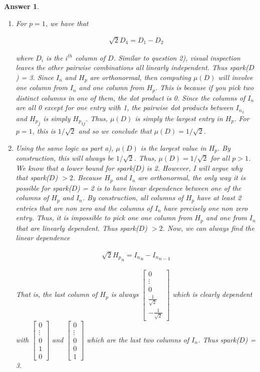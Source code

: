 \documentclass[12pt]{article}
\theoremstyle{colon}
\newtheorem*{answer}{Answer}
\begin{document}
\begin{answer}
  \

  \begin{enumerate}[label=\alph*)]
    \item For $p = 1$, we have that

      \begin{gather*}
        \sqrt{2} D_4 = D_1 - D_2
      \end{gather*}

      where $D_i$ is the $i^{th}$ column of $D$. Similar to question 2), visual inspection leaves the other pairwise combinations all linearly independent. Thus spark($D$) = 3. Since $I_n$ and $H_p$ are orthonormal, then computing $\mu(D)$ will involve one column from $I_n$ and one column from $H_p$. This is because if you pick two distinct columns in one of them, the dot product is 0. Since the columns of $I_n$ are all 0 except for one entry with 1, the pairwise dot products between ${I_n}_i$ and ${H_p}_j$ is simply ${H_p}_{ij}$. Thus, $\mu(D)$ is simply the largest entry in $H_p$. For $p=1$, this is $1/\sqrt{2}$ and so we conclude that $\mu(D) = 1/\sqrt{2}$.

    \item Using the same logic as part a), $\mu(D)$ is the largest value in $H_p$. By construction, this will always be $1/\sqrt{2}$. Thus, $\mu(D) = 1/\sqrt{2}$ for all $p > 1$. We know that a lower bound for spark($D$) is 2. However, I will argue why that spark($D$) $> 2$. Because $H_p$ and $I_n$ are orthonormal, the only way it is possible for spark($D$) = 2 is to have linear dependence between one of the columns of $H_p$ and $I_n$. By construction, all columns of $H_p$ have at least 2 entries that are non zero and the columns of $I_n$ have precisely one non zero entry. Thus, it is impossible to pick one one column from $H_p$ and one from $I_n$ that are linearly dependent. Thus spark($D$) $ > 2$. Now, we can always find the linear dependence

      \begin{gather*}
        \sqrt{2} {H_p}_{n} = {I_n}_n - {I_n}_{n-1}
      \end{gather*}

      That is, the last column of $H_p$ is always $\begin{bmatrix}0 \\ \vdots \\ 0 \\ \frac{1}{\sqrt{2}} \\ -\frac{1}{\sqrt{2}}\end{bmatrix}$ which is clearly dependent with $\begin{bmatrix}0 \\ \vdots \\ 0 \\ 1 \\ 0\end{bmatrix}$ and $\begin{bmatrix}0 \\ \vdots \\ 0 \\ 0 \\ 1\end{bmatrix}$ which are the last two columns of $I_n$. Thus spark($D$) = 3.


\end{enumerate}
\end{answer}
\end{document}
